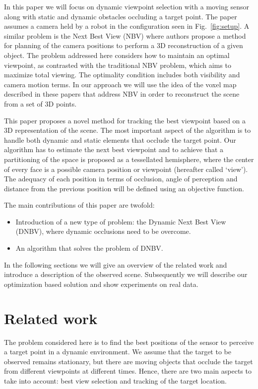 \documentclass[10pt,twocolumn,letterpaper]{article}
\begin{document}
In this paper we will focus on dynamic viewpoint selection with a moving sensor along with static and dynamic obstacles occluding a target point. The paper assumes a camera held by a robot in the configuration seen in Fig.~\ref{fig:setup}. A similar problem is the Next Best View (NBV) \cite{Massios1998,Sanchiz1999} where authors propose a method for planning of the camera positions to perform a 3D reconstruction of a given object. The problem addressed here considers how to maintain an optimal viewpoint, as contrasted with the traditional NBV problem, which aims to maximize total viewing. The optimality condition includes both visibility and camera motion terms. In our approach we will use the idea of the voxel map described in these papers that address NBV in order to reconstruct the scene from a set of 3D points. 

This paper proposes a novel method for tracking the best viewpoint based on a 3D representation of the scene. The most important aspect of the algorithm is to handle both dynamic and static elements that occlude the target point. Our algorithm has to estimate the next best viewpoint and to achieve that a partitioning of the space is proposed as a tessellated hemisphere, where the center of every face is a possible camera position or viewpoint (hereafter called `view'). The adequacy of each position in terms of occlusion, angle of perception and distance from the previous position will be defined using an objective function.  

The main contributions of this paper are twofold:
\begin{itemize}
\item Introduction of a new type of problem: the Dynamic Next Best View (DNBV), where dynamic occlusions need to be overcome.
\item An algorithm that solves the problem of DNBV.
\end{itemize}

In the following sections we will give an overview of the related work and introduce a description of the observed scene. Subsequently we will describe our optimization based solution and show experiments on real data. 


\section{Related work}\label{sec:soa}
The problem considered here is to find the best positions of the sensor to perceive a target point in a dynamic environment. We assume that the target to be observed remains stationary, but there are moving objects that occlude the target from different viewpoints at different times. Hence, there are two main aspects to take into account: best view selection and tracking of the target location.
\end{document}
